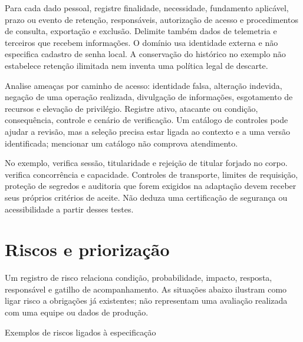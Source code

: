 Para cada dado pessoal, registre finalidade, necessidade, fundamento aplicável,
prazo ou evento de retenção, responsáveis, autorização de acesso e procedimentos
de consulta, exportação e exclusão. Delimite também dados de telemetria e
terceiros que recebem informações. O domínio usa identidade externa e não
especifica cadastro de senha local. A conservação do histórico no exemplo não
estabelece retenção ilimitada nem inventa uma política legal de descarte.

Analise ameaças por caminho de acesso: identidade falsa, alteração indevida,
negação de uma operação realizada, divulgação de informações, esgotamento de
recursos e elevação de privilégio. Registre ativo, atacante ou condição,
consequência, controle e cenário de verificação. Um catálogo de controles pode
ajudar a revisão, mas a seleção precisa estar ligada ao contexto e a uma versão
identificada; mencionar um catálogo não comprova atendimento.

No exemplo,  verifica sessão, titularidade e rejeição de titular
forjado no corpo.  verifica concorrência e capacidade.
Controles de transporte, limites de requisição, proteção de segredos e auditoria
que forem exigidos na adaptação devem receber seus próprios critérios de aceite.
Não deduza uma certificação de segurança ou acessibilidade a partir desses testes.

\clearpage
\section{Riscos e priorização}\label{guia:riscos}
Um registro de risco relaciona condição, probabilidade, impacto, resposta,
responsável e gatilho de acompanhamento. As situações abaixo ilustram como
ligar risco a obrigações já existentes; não representam uma avaliação realizada
com uma equipe ou dados de produção.

\begin{fichasrs}{Exemplos de riscos ligados à especificação}
\end{fichasrs}

